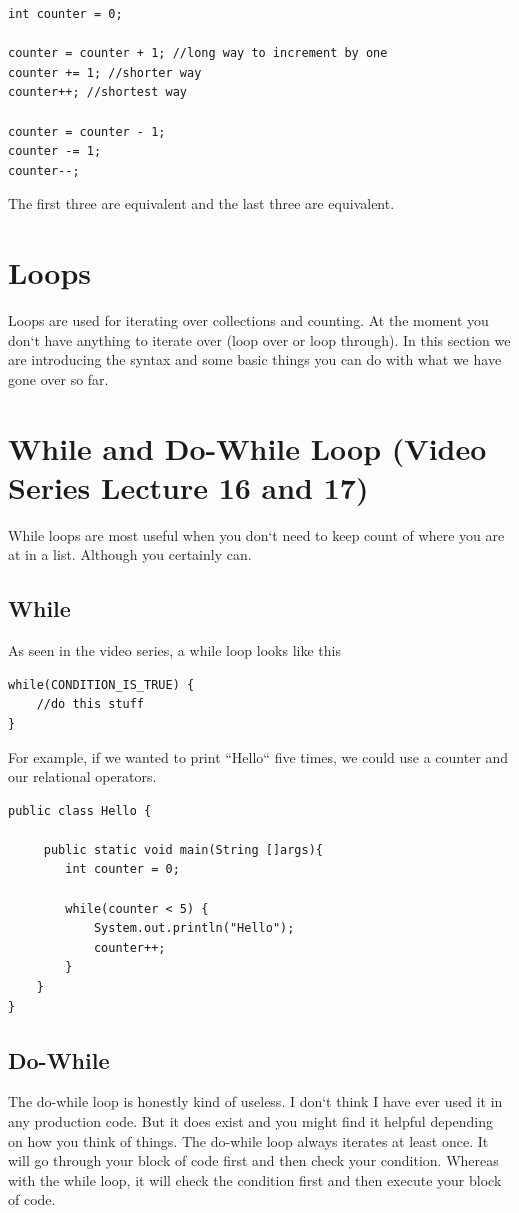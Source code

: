 \documentclass[11]{article}
\begin{document}
\begin{lstlisting}
int counter = 0;

counter = counter + 1; //long way to increment by one
counter += 1; //shorter way
counter++; //shortest way

counter = counter - 1;
counter -= 1;
counter--;
\end{lstlisting}

The first three are equivalent and the last three are equivalent.
\section{Loops}
Loops are used for iterating over collections and counting. At the moment you don`t have anything to iterate over (loop over or loop through). In this section we are introducing the syntax and some basic things you can do with what we have gone over so far.
\section{While and Do-While Loop (Video Series Lecture 16 and 17)}
While loops are most useful when you don`t need to keep count of where you are at in a list. Although you certainly can.
\subsection{While}
As seen in the video series, a while loop looks like this
\begin{lstlisting}
while(CONDITION_IS_TRUE) {
	//do this stuff
}
\end{lstlisting}

For example, if we wanted to print ``Hello`` five times, we could use a  counter and our relational operators.
\begin{lstlisting}
public class Hello {

     public static void main(String []args){
        int counter = 0;
        
        while(counter < 5) {
            System.out.println("Hello");
            counter++;
        }
    }
}
\end{lstlisting}

\subsection{Do-While}
The do-while loop is honestly kind of useless. I don`t think I have ever used it in any production code. But it does exist and you might find it helpful depending on how you think of things. The do-while loop always iterates at least once. It will go through your block of code first and then check your condition. Whereas with the while loop, it will check the condition first and then execute your block of code.\\
\end{document}

